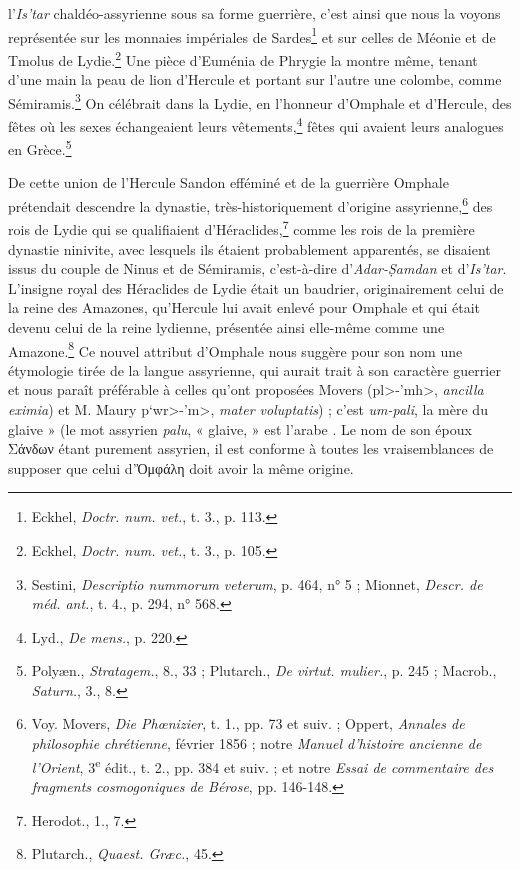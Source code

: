 \documentclass[a4paper, 11pt, oneside]{article}
\newcommand*\svgAAAJ{}
\begin{document}
l'\emph{Is'tar} chaldéo-assyrienne sous sa forme guerrière, c'est ainsi que nous la voyons représentée sur les monnaies impériales de Sardes\footnote{Eckhel, \emph{Doctr. num. vet.}, t. 3., p. 113.} et sur celles de Méonie et de Tmolus de Lydie.\footnote{Eckhel, \emph{Doctr. num. vet.}, t. 3., p. 105.} Une pièce d'Euménia de Phrygie la montre même, tenant d'une main la peau de lion d'Hercule et portant sur l'autre une colombe, comme Sémiramis.\footnote{Sestini, \emph{Descriptio nummorum veterum}, p. 464, n° 5 ; Mionnet, \emph{Descr. de méd. ant.}, t. 4., p. 294, n° 568.} On célébrait dans la Lydie, en l'honneur d'Omphale et d'Hercule, des fêtes où les sexes échangeaient leurs vêtements,\footnote{Lyd., \emph{De mens.}, p. 220.} fêtes qui avaient leurs analogues en Grèce.\footnote{Polyæn., \emph{Stratagem.}, 8., 33 ; Plutarch., \emph{De virtut. mulier.}, p. 245 ; Macrob., \emph{Saturn.}, 3., 8.}

De cette union de l'Hercule Sandon efféminé et de la guerrière Omphale prétendait descendre la dynastie, très-historiquement d'origine assyrienne,\footnote{Voy. Movers, \emph{Die Phœnizier}, t. 1., pp. 73 et suiv. ; Oppert, \emph{Annales de philosophie chrétienne}, février 1856 ; notre \emph{Manuel d'histoire ancienne de l'Orient}, 3\textsuperscript{e} édit., t. 2., pp. 384 et suiv. ; et notre \emph{Essai de commentaire des fragments cosmogoniques de Bérose}, pp. 146-148.} des rois de Lydie qui se qualifiaient d'Héraclides,\footnote{Herodot., 1., 7.} comme les rois de la première dynastie ninivite, avec lesquels ils étaient probablement apparentés, se disaient issus du couple de Ninus et de Sémiramis, c'est-à-dire d'\emph{Adar-\d{S}amdan} et d'\emph{Is'tar}. L'insigne royal des Héraclides de Lydie était un baudrier, originairement celui de la reine des Amazones, qu'Hercule lui avait enlevé pour Omphale et qui était devenu celui de la reine lydienne, présentée ainsi elle-même comme une Amazone.\footnote{Plutarch., \emph{Quaest. Græc.}, 45.} Ce nouvel attribut d'Omphale nous suggère pour son nom une étymologie tirée de la langue assyrienne, qui aurait trait à son caractère guerrier et nous paraît préférable à celles qu'ont proposées Movers (\<pl>-\<'mh>, \emph{ancilla eximia}) et M. Maury \<p`wr>-\<'m>, \emph{mater voluptatis}) ; c'est \emph{um-pali}, la mère du glaive » (le mot assyrien \emph{palu}, « glaive, » est l'arabe $\svgAAAJ$. Le nom de son époux Σάνδων étant purement assyrien, il est conforme à toutes les vraisemblances de supposer que celui d'Ὀμφάλη doit avoir la même origine.
\end{document}
